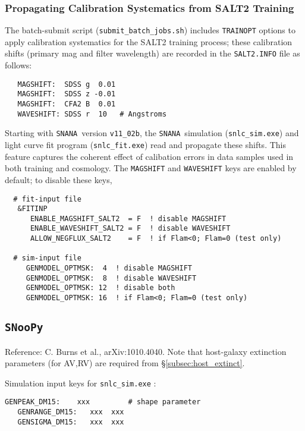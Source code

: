 \documentclass[12pt]{article}
\newcommand{\snoopy}{{\tt SNooPy}}
\newcommand{\snana}{{\tt SNANA}}
\newcommand{\submit}{\tt submit\_batch\_jobs.sh}
\begin{document}
\clearpage
\subsubsection{Propagating Calibration Systematics from SALT2 Training}
\label{sss:trainopt}

The batch-submit script ({\submit}) includes {\tt TRAINOPT}
options to apply calibration systematics for the SALT2 training process;
these calibration shifts (primary mag and filter wavelength) 
are recorded in the {\tt SALT2.INFO} file as 
follows:
\begin{verbatim}
   MAGSHIFT:  SDSS g  0.01   
   MAGSHIFT:  SDSS z -0.01 
   MAGSHIFT:  CFA2 B  0.01 
   WAVESHIFT: SDSS r  10   # Angstroms
\end{verbatim}
%
Starting with \snana\ version {\tt v11\_02b}, the \snana\ simulation 
({\tt snlc\_sim.exe}) and light curve fit program ({\tt snlc\_fit.exe})
read and propagate these shifts.
This feature captures the coherent effect of calibation errors in
data samples used in both training and cosmology.
The {\tt MAGSHIFT} and {\tt WAVESHIFT} keys are enabled by default;
to disable these keys,
\begin{verbatim} 
  # fit-input file
   &FITINP
      ENABLE_MAGSHIFT_SALT2  = F  ! disable MAGSHIFT 
      ENABLE_WAVESHIFT_SALT2 = F  ! disable WAVESHIFT
      ALLOW_NEGFLUX_SALT2    = F  ! if Flam<0; Flam=0 (test only)

  # sim-input file
     GENMODEL_OPTMSK:  4  ! disable MAGSHIFT 
     GENMODEL_OPTMSK:  8  ! disable WAVESHIFT 
     GENMODEL_OPTMSK: 12  ! disable both
     GENMODEL_OPTMSK: 16  ! if Flam<0; Flam=0 (test only)
\end{verbatim}

\clearpage
\subsection{{\snoopy}}
\label{subsec:snoopy}

\noindent
Reference: C. Burns et al., arXiv:1010.4040. 
Note that host-galaxy extinction parameters (for AV,RV) 
are required from \S\ref{subsec:host_extinct}.

\noindent
Simulation input keys  for {\tt snlc\_sim.exe} :
\begin{Verbatim}[frame=single]
   GENPEAK_DM15:    xxx         # shape parameter
   GENRANGE_DM15:   xxx  xxx
   GENSIGMA_DM15:   xxx  xxx  
\end{Verbatim}
\end{document}
